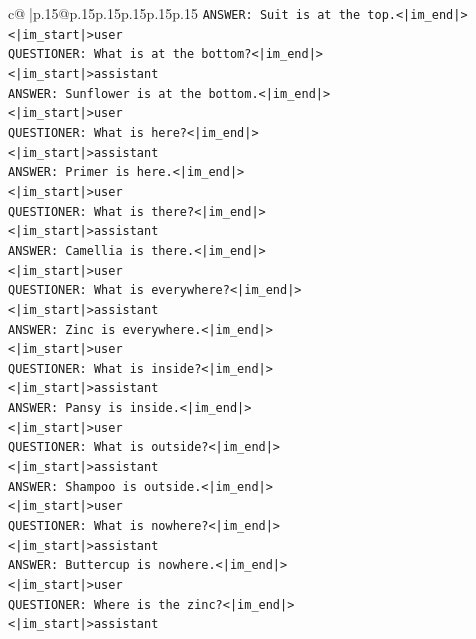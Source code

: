 \documentclass{article}
\begin{document}
{\begin{supertabular}{c@{$\;$}|p{.15\linewidth}@{}p{.15\linewidth}p{.15\linewidth}p{.15\linewidth}p{.15\linewidth}p{.15\linewidth}}
{{{\texttt{ANSWER: Suit is at the top.<|im\_end|>} \\
\texttt{<|im\_start|>user} \\
\texttt{QUESTIONER: What is at the bottom?<|im\_end|>} \\
\texttt{<|im\_start|>assistant} \\
\texttt{ANSWER: Sunflower is at the bottom.<|im\_end|>} \\
\texttt{<|im\_start|>user} \\
\texttt{QUESTIONER: What is here?<|im\_end|>} \\
\texttt{<|im\_start|>assistant} \\
\texttt{ANSWER: Primer is here.<|im\_end|>} \\
\texttt{<|im\_start|>user} \\
\texttt{QUESTIONER: What is there?<|im\_end|>} \\
\texttt{<|im\_start|>assistant} \\
\texttt{ANSWER: Camellia is there.<|im\_end|>} \\
\texttt{<|im\_start|>user} \\
\texttt{QUESTIONER: What is everywhere?<|im\_end|>} \\
\texttt{<|im\_start|>assistant} \\
\texttt{ANSWER: Zinc is everywhere.<|im\_end|>} \\
\texttt{<|im\_start|>user} \\
\texttt{QUESTIONER: What is inside?<|im\_end|>} \\
\texttt{<|im\_start|>assistant} \\
\texttt{ANSWER: Pansy is inside.<|im\_end|>} \\
\texttt{<|im\_start|>user} \\
\texttt{QUESTIONER: What is outside?<|im\_end|>} \\
\texttt{<|im\_start|>assistant} \\
\texttt{ANSWER: Shampoo is outside.<|im\_end|>} \\
\texttt{<|im\_start|>user} \\
\texttt{QUESTIONER: What is nowhere?<|im\_end|>} \\
\texttt{<|im\_start|>assistant} \\
\texttt{ANSWER: Buttercup is nowhere.<|im\_end|>} \\
\texttt{<|im\_start|>user} \\
\texttt{QUESTIONER: Where is the zinc?<|im\_end|>} \\
\texttt{<|im\_start|>assistant} \\
}}}
\end{supertabular}}
\end{document}
